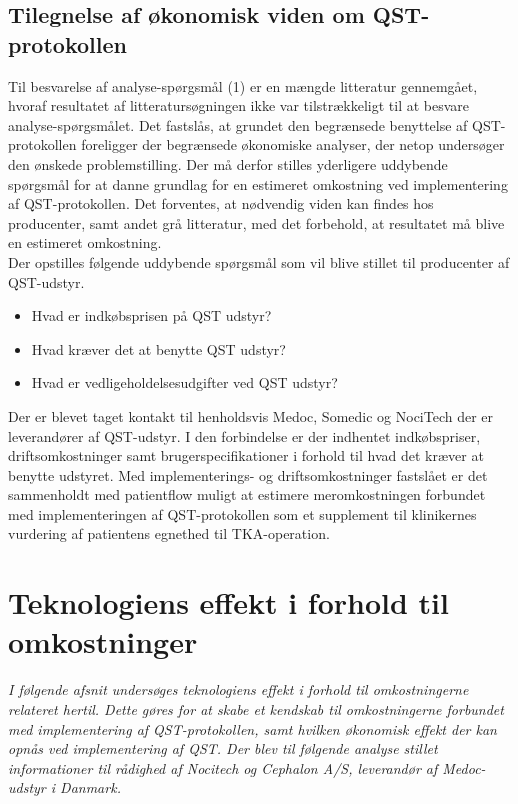 \subsection{Tilegnelse af økonomisk viden om QST-protokollen}
Til besvarelse af analyse-spørgsmål (1) er en mængde litteratur gennemgået, hvoraf resultatet af litteratursøgningen ikke var tilstrækkeligt til at besvare analyse-spørgsmålet. Det fastslås, at grundet den begrænsede benyttelse af QST-protokollen foreligger der begrænsede økonomiske analyser, der netop undersøger den ønskede problemstilling. Der må derfor stilles yderligere uddybende spørgsmål for at danne grundlag for en estimeret omkostning ved implementering af QST-protokollen. Det forventes, at nødvendig viden kan findes hos producenter, samt andet grå litteratur, med det forbehold, at resultatet må blive en estimeret omkostning.\\ 
Der opstilles følgende uddybende spørgsmål som vil blive stillet til producenter af QST-udstyr.

\begin{itemize} 
\item Hvad er indkøbsprisen på QST udstyr? 
\item Hvad kræver det at benytte QST udstyr? 
\item Hvad er vedligeholdelsesudgifter ved QST udstyr?
\end{itemize}

Der er blevet taget kontakt til henholdsvis Medoc, Somedic og NociTech der er leverandører af QST-udstyr. I den forbindelse er der indhentet indkøbspriser, driftsomkostninger samt brugerspecifikationer i forhold til hvad det kræver at benytte udstyret. Med implementerings- og driftsomkostninger fastslået er det sammenholdt med patientflow muligt at estimere meromkostningen forbundet med implementeringen af QST-protokollen som et supplement til klinikernes vurdering af patientens egnethed til TKA-operation. 

\section{Teknologiens effekt i forhold til omkostninger} \label{priser}
\textit{I følgende afsnit undersøges teknologiens effekt i forhold til omkostningerne relateret hertil. Dette gøres for at skabe et kendskab til omkostningerne forbundet med implementering af QST-protokollen, samt hvilken økonomisk effekt der kan opnås ved implementering af QST. Der blev til følgende analyse stillet informationer til rådighed af Nocitech og Cephalon A/S, leverandør af Medoc-udstyr i Danmark.}

